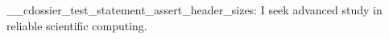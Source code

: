 \documentclass[type=purpose]{careerdossier-statement}
\begin{document}
\MakeCDossierStatementHeader
\ExplSyntaxOn
\__cdossier_test_statement_assert_header_sizes:
\ExplSyntaxOff
I seek advanced study in reliable scientific computing.
\end{document}
